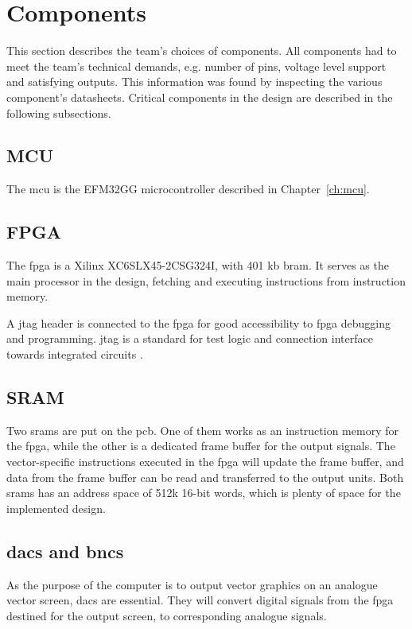\section{Components}
This section describes the team's choices of components.
All components had to meet the team's technical demands, e.g. number of pins, voltage level support and satisfying outputs.
This information was found by inspecting the various component's datasheets.
Critical components in the design are described in the following subsections.

\subsection{MCU}
The \gls{mcu} is the EFM32GG microcontroller described in Chapter~\ref{ch:mcu}.

\subsection{FPGA}
The \gls{fpga} is a Xilinx XC6SLX45-2CSG324I, with 401 kb \gls{bram}.
It serves as the main processor in the design, fetching and executing instructions from instruction memory.

A \gls{jtag} header is connected to the \gls{fpga} for good accessibility to \gls{fpga} debugging and programming.
\gls{jtag} is a standard for test logic and connection interface towards integrated circuits \cite{jtag}.

\subsection{SRAM}
Two \gls{sram}s are put on the \gls{pcb}.
One of them works as an instruction memory for the \gls{fpga}, while the other is a dedicated frame buffer for the output signals.
The vector-specific instructions executed in the \gls{fpga} will update the frame buffer, and data from the frame buffer can be read and transferred to the output units.
Both \gls{sram}s has an address space of 512k 16-bit words, which is plenty of space for the implemented design.

\subsection{\gls{dac}s and \gls{bnc}s}
As the purpose of the computer is to output vector graphics on an analogue vector screen, \gls{dac}s are essential.
They will convert digital signals from the \gls{fpga} destined for the output screen, to corresponding analogue signals.


